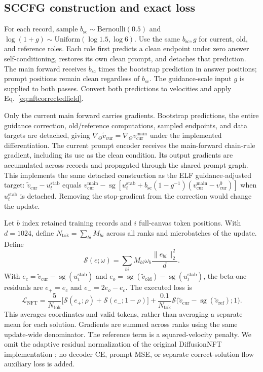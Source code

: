\documentclass{article}
\newcommand{\sg}{\operatorname{sg}}
\begin{document}
\subsection{SCCFG construction and exact loss}

For each record, sample $b_{\mathrm{sc}}\sim\mathrm{Bernoulli}(0.5)$ and $\log(1+g)\sim\mathrm{Uniform}(\log1.5,\log6)$. Use the same $b_{\mathrm{sc}},g$ for current, old, and reference roles. Each role first predicts a clean endpoint under zero answer self-conditioning, restores its own clean prompt, and detaches that prediction. The main forward receives $b_{\mathrm{sc}}$ times the bootstrap prediction in answer positions; prompt positions remain clean regardless of $b_{\mathrm{sc}}$. The guidance-scale input $g$ is supplied to both passes. Convert both predictions to velocities and apply Eq.~\eqref{eq:nftcorrectedfield}.

Only the current main forward carries gradients. Bootstrap predictions, the entire guidance correction, old/reference computations, sampled endpoints, and data targets are detached, giving $\nabla_\Theta\widetilde v_{\mathrm{cur}}=\nabla_\Theta v_{\mathrm{cur}}^{\mathrm{main}}$ under the implemented differentiation. The current prompt encoder receives the main-forward chain-rule gradient, including its use as the clean condition. Its output gradients are accumulated across records and propagated through the shared prompt graph. This implements the same detached construction as the ELF guidance-adjusted target: $\widetilde v_{\mathrm{cur}}-u_t^{\mathrm{stab}}$ equals $v_{\mathrm{cur}}^{\mathrm{main}}-\sg[u_t^{\mathrm{stab}}+b_{\mathrm{sc}}(1-g^{-1})(v_{\mathrm{cur}}^{\mathrm{main}}-v_{\mathrm{cur}}^0)]$ when $u_t^{\mathrm{stab}}$ is detached. Removing the stop-gradient from the correction would change the update.

Let $b$ index retained training records and $i$ full-canvas token positions. With $d=1024$, define $N_{\mathrm{tok}}=\sum_{bi}M_{bi}$ across all ranks and microbatches of the update. Define
\begin{equation}
 \mathcal S(e;\omega)=\sum_{bi}M_{bi}\omega_b\frac{\|e_{bi}\|_2^2}{d}.
 \label{eq:nfttokensum}
\end{equation}
With $e_c=\widetilde v_{\mathrm{cur}}-\sg(u_t^{\mathrm{stab}})$ and $e_o=\sg(\widetilde v_{\mathrm{old}})-\sg(u_t^{\mathrm{stab}})$, the beta-one residuals are $e_+=e_c$ and $e_-=2e_o-e_c$. The executed loss is
\begin{equation}
 \mathcal L_{\mathrm{NFT}}=
 \frac{5}{N_{\mathrm{tok}}}\bigl[\mathcal S(e_+;\rho)+\mathcal S(e_-;1-\rho)\bigr]
 +\frac{0.1}{N_{\mathrm{tok}}}\mathcal S\bigl(\widetilde v_{\mathrm{cur}}-\sg(\widetilde v_{\mathrm{ref}});1\bigr).
 \label{eq:nftexecutedloss}
\end{equation}
This averages coordinates and valid tokens, rather than averaging a separate mean for each solution. Gradients are summed across ranks using the same update-wide denominator. The reference term is a squared-velocity penalty. We omit the adaptive residual normalization of the original DiffusionNFT implementation \citep{diffusionnft}; no decoder CE, prompt MSE, or separate correct-solution flow auxiliary loss is added.
\end{document}
